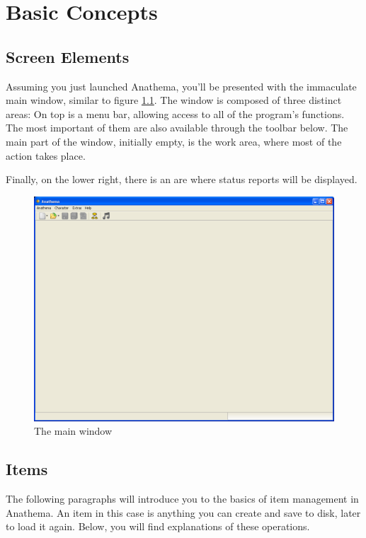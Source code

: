 \chapter{Basic Concepts}

\section{Screen Elements}
Assuming you just launched Anathema, you'll be presented with the immaculate main window, similar to figure \ref{fig:MainWindow}. The window is composed of three distinct areas: On top is a menu bar, allowing access to all of the program's functions. The most important of them are also available through the toolbar below. The main part of the window, initially empty, is the work area, where most of the action takes place. 

Finally, on the lower right, there is an are where status reports will be displayed.

\begin{figure}[h]
	\centering
		\includegraphics[width=1.00\textwidth]{images/MainWindow.png}
	\caption{The main window}
	\label{fig:MainWindow}
\end{figure}

\section{Items}
The following paragraphs will introduce you to the basics of item management in Anathema. An item in this case is anything 
you can create and save to disk, later to load it again. Below, you will find explanations of these operations.

